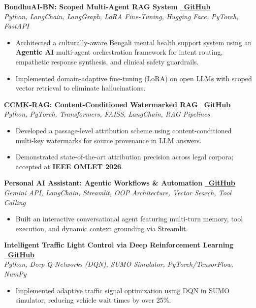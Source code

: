\documentclass[a4paper,9.5pt]{article}
\newcommand{\projectEntry}[4]{
  \vspace{2pt}
  \noindent\textbf{\color{primary}#1} \hfill \href{#3}{\color{primary}\textbf{\faGithub~GitHub}} \\
  \noindent\textit{\footnotesize #2}
  \begin{itemize}[leftmargin=10pt, topsep=1pt, itemsep=1pt]
    #4
  \end{itemize}
}
\begin{document}
\projectEntry
  {BondhuAI-BN: Scoped Multi-Agent RAG System}
  {Python, LangChain, LangGraph, LoRA Fine-Tuning, Hugging Face, PyTorch, FastAPI}
  {https://github.com/ashraf1600}
  {
    \item Architected a culturally-aware Bengali mental health support system using an \textbf{Agentic AI} multi-agent orchestration framework for intent routing, empathetic response synthesis, and clinical safety guardrails.
    \item Implemented domain-adaptive fine-tuning (LoRA) on open LLMs with scoped vector retrieval to eliminate hallucinations.
  }

\projectEntry
  {CCMK-RAG: Content-Conditioned Watermarked RAG}
  {Python, PyTorch, Transformers, FAISS, LangChain, RAG Pipelines}
  {https://github.com/ashraf1600}
  {
    \item Developed a passage-level attribution scheme using content-conditioned multi-key watermarks for source provenance in LLM answers.
    \item Demonstrated state-of-the-art attribution precision across legal corpora; accepted at \textbf{IEEE OMLET 2026}.
  }

\projectEntry
  {Personal AI Assistant: Agentic Workflows \& Automation}
  {Gemini API, LangChain, Streamlit, OOP Architecture, Vector Search, Tool Calling}
  {https://github.com/ashraf1600/Personal-AI-Assistant-Gemini-API-OOP-Streamlit-/tree/main}
  {
    \item Built an interactive conversational agent featuring multi-turn memory, tool execution, and dynamic context grounding via Streamlit.
  }

\projectEntry
  {Intelligent Traffic Light Control via Deep Reinforcement Learning}
  {Python, Deep Q-Networks (DQN), SUMO Simulator, PyTorch/TensorFlow, NumPy}
  {https://github.com/ashraf1600/Traffic_Light_Control_using_Reinforcement_Learning}
  {
    \item Implemented adaptive traffic signal optimization using DQN in SUMO simulator, reducing vehicle wait times by over 25\%.
  }

\end{document}
